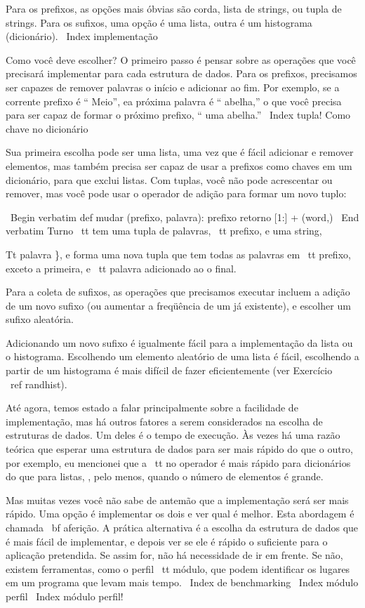 \documentclass[10pt]{book}
\begin{document}
{{{{{{{{{Para os prefixos, as opções mais óbvias são corda,
lista de strings, ou tupla de strings. Para os sufixos,
uma opção é uma lista, outra é um histograma (dicionário).
\ Index {implementação}

Como você deve escolher? O primeiro passo é pensar sobre
as operações que você precisará implementar para cada estrutura de dados.
Para os prefixos, precisamos ser capazes de remover palavras
o início e adicionar ao fim. Por exemplo, se a corrente
prefixo é `` Meio'', ea próxima palavra é `` abelha,'' o que você precisa
para ser capaz de formar o próximo prefixo, `` uma abelha.''
\ Index {tupla! Como chave no dicionário}

Sua primeira escolha pode ser uma lista, uma vez que é fácil adicionar
e remover elementos, mas também precisa ser capaz de usar a
prefixos como chaves em um dicionário, para que exclui listas.
Com tuplas, você não pode acrescentar ou remover, mas você pode usar
o operador de adição para formar um novo tuplo:

\ Begin {verbatim}
def mudar (prefixo, palavra):
    prefixo retorno [1:] + (word,)
\ End {verbatim}
%
{Turno \ tt} tem uma tupla de palavras, {\ tt prefixo}, e uma string, 
{Tt palavra \}, e forma uma nova tupla que tem todas as palavras
em {\ tt prefixo}, exceto a primeira, e {\ tt palavra} adicionado ao
o final.

Para a coleta de sufixos, as operações que precisamos
executar incluem a adição de um novo sufixo (ou aumentar a freqüência
de um já existente), e escolher um sufixo aleatória.

Adicionando um novo sufixo é igualmente fácil para a implementação da lista
ou o histograma. Escolhendo um elemento aleatório de uma lista
é fácil, escolhendo a partir de um histograma é mais difícil de fazer
eficientemente (ver Exercício ~ \ ref {randhist}).

Até agora, temos estado a falar principalmente sobre a facilidade de implementação,
mas há outros fatores a serem considerados na escolha de estruturas de dados.
Um deles é o tempo de execução. Às vezes há uma razão teórica que esperar
uma estrutura de dados para ser mais rápido do que o outro, por exemplo, eu mencionei
que a {\ tt no} operador é mais rápido para dicionários do que para listas,
, pelo menos, quando o número de elementos é grande.

Mas muitas vezes você não sabe de antemão que a implementação será
ser mais rápido. Uma opção é implementar os dois e ver qual
é melhor. Esta abordagem é chamada {\ bf aferição}. A prática
alternativa é a escolha da estrutura de dados que é
mais fácil de implementar, e depois ver se ele é rápido o suficiente para o
aplicação pretendida. Se assim for, não há necessidade de ir em frente. Se não,
existem ferramentas, como o perfil {\ tt} módulo, que podem identificar
os lugares em um programa que levam mais tempo.
\ Index {} de benchmarking
\ Index {módulo perfil}
\ Index {módulo perfil!}

}}}}}}}}}}
\end{document}
